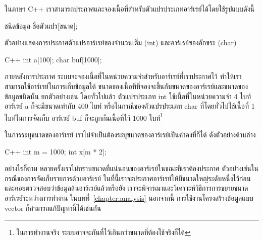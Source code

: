 ใน{\wbr}ภาษา C++
เรา{\wbr}สามารถ{\wbr}ประกาศ{\wbr}และ{\wbr}จอง{\wbr}เนื้อที่{\wbr}สำหรับ{\wbr}ตัวแปร{\wbr}ประเภท{\wbr}อาร์เรย์{\wbr}ได้{\wbr}โดย{\wbr}ใช้{\wbr}รูปแบบ{\wbr}ดังนี้{\wbr}

\begin{center}
ชนิด{\wbr}ข้อมูล ชื่อ{\wbr}ตัวแปร[ขนาด];
\end{center}

ตัวอย่าง{\wbr}แสดง{\wbr}การ{\wbr}ประกาศ{\wbr}ตัวแปร{\wbr}อาร์เรย์{\wbr}ของ{\wbr}จำนวนเต็ม ({\ct int})
และ{\wbr}อาร์เรย์{\wbr}ของ{\wbr}อักขระ ({\ct char})

\latintext
\begin{codelist}{C++}{}
int a[100];
char buf[1000];
\end{codelist}
\thaitext

ภายหลัง{\wbr}การ{\wbr}ประกาศ ระบบ{\wbr}จะ{\wbr}จอง{\wbr}เนื้อที่{\wbr}ใน{\wbr}หน่วยความจำ{\wbr}สำหรับ{\wbr}อาร์เรย์{\wbr}ที่{\wbr}เรา{\wbr}ประกาศ{\wbr}ไว้{\wbr}
ทำ{\wbr}ให้{\wbr}เรา{\wbr}สามารถ{\wbr}ใช้{\wbr}อาร์เรย์{\wbr}ใน{\wbr}การ{\wbr}เก็บ{\wbr}ข้อมูล{\wbr}ได้{\wbr}
ขนาด{\wbr}ของ{\wbr}เนื้อที่{\wbr}ที่{\wbr}จอง{\wbr}จะ{\wbr}ขึ้น{\wbr}กับ{\wbr}ขนาด{\wbr}ของ{\wbr}อาร์เรย์{\wbr}และ{\wbr}ขนาด{\wbr}ของ{\wbr}ข้อมูล{\wbr}ชนิด{\wbr}นั้น ยก{\wbr}ตัวอย่าง{\wbr}เช่น{\wbr}
โดย{\wbr}ทั่วไป{\wbr}แล้ว ตัวแปร{\wbr}ประเภท {\ct int} ใช้เนื้อ{\wbr}ที่{\wbr}ใน{\wbr}หน่วยความจำ 4 ไบท์ อาร์เรย์ {\ct
  a} ก็{\wbr}จะ{\wbr}มี{\wbr}ขนาด{\wbr}เท่า{\wbr}กับ 400 ไบท์ หรือ{\wbr}ใน{\wbr}กรณี{\wbr}ของ{\wbr}ตัวแปร{\wbr}ประเภท {\ct char}
ที่{\wbr}โดย{\wbr}ทั่วไป{\wbr}ใช้เนื้อ{\wbr}ที่ 1 ไบท์ใน{\wbr}การ{\wbr}จัด{\wbr}เก็บ อาร์เรย์ {\ct buf} ก็{\wbr}จะ{\wbr}ถูก{\wbr}กัน{\wbr}เนื้อที่{\wbr}ไว้ 1000
ไบท์\footnote{ใน{\wbr}การ{\wbr}ทำงาน{\wbr}จริง ระบบ{\wbr}อาจ{\wbr}จะ{\wbr}กัน{\wbr}ที่{\wbr}ไว้{\wbr}เกิน{\wbr}กว่า{\wbr}ขนาด{\wbr}ที่{\wbr}ต้อง{\wbr}ใช้{\wbr}จริง{\wbr}ก็ได้}

ใน{\wbr}การ{\wbr}ระบุ{\wbr}ขนาด{\wbr}ของ{\wbr}อาร์เรย์ เรา{\wbr}ไม่{\wbr}จำเป็น{\wbr}ต้อง{\wbr}ระบุ{\wbr}ขนาด{\wbr}ของ{\wbr}อาร์เรย์{\wbr}เป็น{\wbr}ค่าคงที่{\wbr}ก็ได้ ดัง{\wbr}ตัวอย่าง{\wbr}ด้าน{\wbr}ล่าง{\wbr}

\latintext
\begin{codelist}{C++}{}
int m = 1000;
int x[m * 2];
\end{codelist}
\thaitext

อย่างไรก็ตาม หลาย{\wbr}ครั้ง{\wbr}เรา{\wbr}ไม่{\wbr}ทราบ{\wbr}ขนาด{\wbr}ที่{\wbr}แน่นอน{\wbr}ของ{\wbr}อาร์เรย์{\wbr}ใน{\wbr}ขณะที่{\wbr}เรา{\wbr}ต้อง{\wbr}ประกาศ{\wbr}
ตัวอย่าง{\wbr}เช่น{\wbr}ใน{\wbr}กรณี{\wbr}ของ{\wbr}การ{\wbr}จัด{\wbr}เก็บ{\wbr}รายการ{\wbr}ด้วย{\wbr}อาร์เรย์
ใน{\wbr}ที่นี้{\wbr}เรา{\wbr}จะ{\wbr}ประกาศ{\wbr}อาร์เรย์{\wbr}ให้{\wbr}มี{\wbr}ขนาด{\wbr}ใหญ่{\wbr}ระดับ{\wbr}หนึ่ง{\wbr}ไว้{\wbr}ก่อน{\wbr}
และ{\wbr}คอย{\wbr}ตรวจสอบ{\wbr}ว่า{\wbr}ข้อมูล{\wbr}ล้น{\wbr}อาร์เรย์{\wbr}แล้ว{\wbr}หรือยัง{\wbr}
เรา{\wbr}จะ{\wbr}พิจารณา{\wbr}และ{\wbr}วิเคราะห์{\wbr}วิธีการ{\wbr}การ{\wbr}ขยาย{\wbr}ขนาด{\wbr}อาร์เรย์{\wbr}ระหว่าง{\wbr}การ{\wbr}ทำงาน{\wbr}
ใน{\wbr}บท{\wbr}ที่~\ref{chapter:analysis} นอกจากนี้ การ{\wbr}ใช้{\wbr}งาน{\wbr}โครงสร้าง{\wbr}ข้อมูล{\wbr}แบบ {\ct
  vector} ก็{\wbr}สามารถ{\wbr}แก้{\wbr}ปัญหา{\wbr}นี้{\wbr}ได้{\wbr}เช่นกัน{\wbr}

